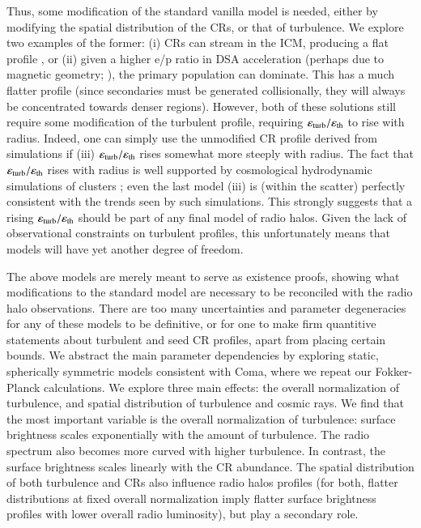 \documentclass[fleqn,usenatbib,useAMS]{mnras}
\newcommand{\eps}{\varepsilon}
\begin{document}
Thus, some modification of the standard vanilla model is needed, either by modifying the spatial distribution of the CRs, or that of turbulence. We explore two examples of the former: (i) CRs can stream in the ICM, producing a flat profile \citep{ensslin11,wiener13}, or (ii) given a higher e/p ratio in DSA acceleration (perhaps due to magnetic geometry; \citealt{2014ApJ...794..153G}), the primary population can dominate. This has a much flatter profile (since secondaries must be generated collisionally, they will always be concentrated towards denser regions). However, both of these solutions still require some modification of the turbulent profile, requiring $\eps_{\rm turb}/\eps_{\rm th}$ to rise with radius. Indeed, one can simply use the unmodified CR profile derived from simulations if (iii) $\eps_{\rm turb}/\eps_{\rm th}$ rises somewhat more steeply with radius. The fact that $\eps_{\rm turb}/\eps_{\rm th}$ rises with radius is well supported by cosmological hydrodynamic simulations of clusters \citep{2009ApJ...705.1129L,2010ApJ...725.1452S,vazza11}; even the last model (iii) is (within the scatter) perfectly consistent with the trends seen by such simulations. This strongly suggests that a rising $\eps_{\rm turb}/\eps_{\rm th}$ should be part of any final model of radio halos. Given the lack of observational constraints on turbulent profiles, this unfortunately means that models will have yet another degree of freedom. 

The above models are merely meant to serve as existence proofs, showing what
modifications to the standard model are necessary to be reconciled with the
radio halo observations. There are too many uncertainties and parameter
degeneracies for any of these models to be definitive, or for one to make firm
quantitive statements about turbulent and seed CR profiles, apart from placing
certain bounds. We abstract the main parameter dependencies by exploring static,
spherically symmetric models consistent with Coma, where we repeat our
Fokker-Planck calculations. We explore three main effects: the overall
normalization of turbulence, and spatial distribution of turbulence and cosmic
rays.
We find that the most important variable is the overall normalization of
turbulence: surface brightness scales exponentially with the amount of
turbulence. The radio spectrum also becomes more curved with higher
turbulence. In contrast, the surface brightness scales linearly with the CR
abundance.  The spatial distribution of both turbulence and CRs also influence
radio halos profiles (for both, flatter distributions at fixed overall
normalization imply flatter surface brightness profiles with lower overall radio
luminosity), but play a secondary role.
\end{document}
